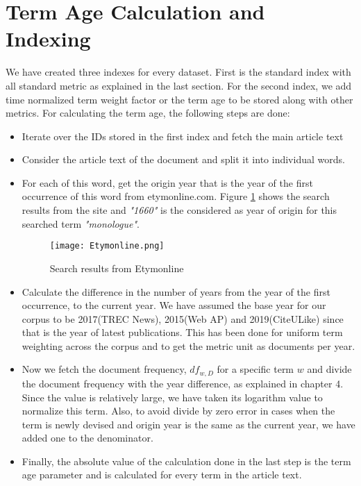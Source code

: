 \section{Term Age Calculation and Indexing}
We have created three indexes for every dataset. First is the standard index with all standard metric as explained in the last section. For the second index, we add time normalized term weight factor or the term age to be stored along with other metrics. For calculating the term age, the following steps are done:
\begin{itemize}
    \item Iterate over the IDs stored in the first index and fetch the main article text
    \item Consider the article text of the document and split it into individual words. 
    \item For each of this word, get the origin year that is the year of the first occurrence of this word from etymonline.com.
    Figure \ref{fig:etymonline} shows the search results from the site and \textit{"1660"} is the considered as year of origin for this searched term \textit{"monologue"}.
    \begin{figure}[h!]
    \centering
    \texttt{[image: Etymonline.png]}
    \caption{Search results from Etymonline}
    \label{fig:etymonline}
    \end{figure}
    \item Calculate the difference in the number of years from the year of the first occurrence, to the current year. We have assumed the base year for our corpus to be 2017(TREC News), 2015(Web AP) and 2019(CiteULike) since that is the year of latest publications. This has been done for uniform term weighting across the corpus and to get the metric unit as documents per year.
    \item Now we fetch the document frequency, $df_{w,D}$ for a specific term $w$ and divide the document frequency with the year difference, as explained in chapter 4. 
    Since the value is relatively large, we have taken its logarithm value to normalize this term. Also, to avoid divide by zero error in cases when the term is newly devised and origin year is the same as the current year, we have added one to the denominator.
    \item Finally, the absolute value of the calculation done in the last step is the term age parameter and is calculated for every term in the article text. 
\end{itemize}

